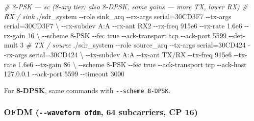 \documentclass[
  10pt,
]{article}
\newenvironment{Shaded}{\begin{snugshade}}{\end{snugshade}}
\newcommand{\AttributeTok}[1]{\textcolor[rgb]{0.77,0.63,0.00}{#1}}
\newcommand{\CommentTok}[1]{\textcolor[rgb]{0.56,0.35,0.01}{\textit{#1}}}
\newcommand{\DataTypeTok}[1]{\textcolor[rgb]{0.13,0.29,0.53}{#1}}
\newcommand{\ExtensionTok}[1]{#1}
\newcommand{\NormalTok}[1]{#1}
\begin{document}
\begin{Shaded}
\begin{Highlighting}[]
\CommentTok{\# 8{-}PSK — sc   (8{-}ary tier: also 8{-}DPSK, same gains — more TX, lower RX)}
\CommentTok{\# RX / sink}
\ExtensionTok{./sdr\_system} \AttributeTok{{-}{-}role}\NormalTok{ sink\_arq }\AttributeTok{{-}{-}rx{-}args}\NormalTok{ serial=30CD3F7 }\AttributeTok{{-}{-}tx{-}args}\NormalTok{ serial=30CD3F7 }\DataTypeTok{\textbackslash{}}
  \AttributeTok{{-}{-}rx{-}subdev}\NormalTok{ A:A }\AttributeTok{{-}{-}rx{-}ant}\NormalTok{ RX2 }\AttributeTok{{-}{-}rx{-}freq}\NormalTok{ 915e6 }\AttributeTok{{-}{-}rx{-}rate}\NormalTok{ 1.6e6 }\AttributeTok{{-}{-}rx{-}gain}\NormalTok{ 16 }\DataTypeTok{\textbackslash{}}
  \AttributeTok{{-}{-}scheme}\NormalTok{ 8{-}PSK }\AttributeTok{{-}{-}fec}\NormalTok{ true }\AttributeTok{{-}{-}ack{-}transport}\NormalTok{ tcp }\AttributeTok{{-}{-}ack{-}port}\NormalTok{ 5599 }\AttributeTok{{-}{-}det{-}mult}\NormalTok{ 3}
\CommentTok{\# TX / source}
\ExtensionTok{./sdr\_system} \AttributeTok{{-}{-}role}\NormalTok{ source\_arq }\AttributeTok{{-}{-}tx{-}args}\NormalTok{ serial=30CD424 }\AttributeTok{{-}{-}rx{-}args}\NormalTok{ serial=30CD424 }\DataTypeTok{\textbackslash{}}
  \AttributeTok{{-}{-}tx{-}subdev}\NormalTok{ A:A }\AttributeTok{{-}{-}tx{-}ant}\NormalTok{ TX/RX }\AttributeTok{{-}{-}tx{-}freq}\NormalTok{ 915e6 }\AttributeTok{{-}{-}tx{-}rate}\NormalTok{ 1.6e6 }\AttributeTok{{-}{-}tx{-}gain}\NormalTok{ 86 }\DataTypeTok{\textbackslash{}}
  \AttributeTok{{-}{-}scheme}\NormalTok{ 8{-}PSK }\AttributeTok{{-}{-}fec}\NormalTok{ true }\AttributeTok{{-}{-}ack{-}transport}\NormalTok{ tcp }\AttributeTok{{-}{-}ack{-}host}\NormalTok{ 127.0.0.1 }\AttributeTok{{-}{-}ack{-}port}\NormalTok{ 5599 }\AttributeTok{{-}{-}timeout}\NormalTok{ 3000}
\end{Highlighting}
\end{Shaded}

For \textbf{8-DPSK}, same commands with \texttt{-\/-scheme\ 8-DPSK}.

\hypertarget{ofdm---waveform-ofdm-64-subcarriers-cp-16}{%
\subsubsection{\texorpdfstring{OFDM (\texttt{-\/-waveform\ ofdm}, 64
subcarriers, CP
16)}{OFDM (-\/-waveform ofdm, 64 subcarriers, CP 16)}}\label{ofdm---waveform-ofdm-64-subcarriers-cp-16}}
\end{document}

